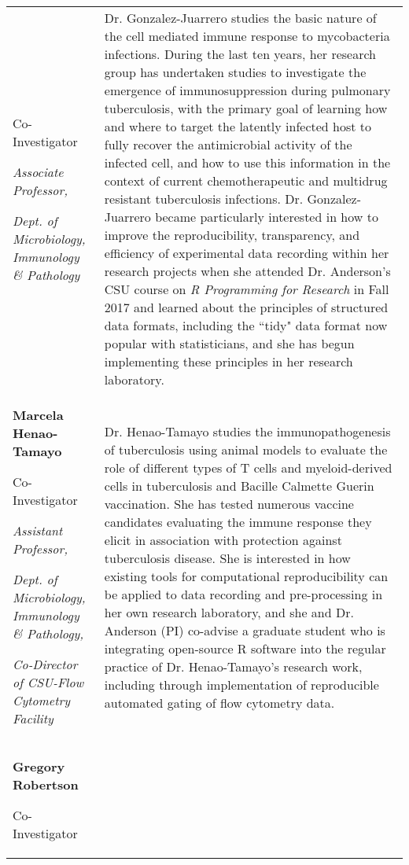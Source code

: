 \begin{table}[!h]
{\begin{tabular}[t]{>{\raggedright\arraybackslash}p{14em}>{\raggedright\arraybackslash}p{35em}}
  Co-Investigator
  
  \textit{Associate Professor,}
  
  \textit{Dept. of Microbiology, Immunology \& Pathology} & Dr. Gonzalez-Juarrero studies the basic nature of the
  cell mediated immune response to mycobacteria infections. During the last ten
  years, her research group has undertaken studies to investigate the emergence of
  immunosuppression during pulmonary tuberculosis, with the primary goal of
  learning how and where to target the latently infected host to fully recover the
  antimicrobial activity of the infected cell, and how to use this information in
  the context of current chemotherapeutic and multidrug resistant tuberculosis infections.
  Dr. Gonzalez-Juarrero became particularly interested in how to improve the
  reproducibility, transparency, and efficiency of experimental data recording
  within her research projects when she attended Dr. Anderson's CSU course on
  \textit{R Programming for Research} in Fall 2017 and learned about the
  principles of structured data formats, including the ``tidy" data format now
  popular with statisticians, and she has begun implementing these principles in her research laboratory.\\
\textbf{Marcela Henao-Tamayo}
  
  Co-Investigator
  
  \textit{Assistant Professor,}
  
  \textit{Dept. of Microbiology, Immunology \& Pathology,}
  
  \textit{Co-Director of CSU-Flow Cytometry Facility} & Dr. Henao-Tamayo studies the immunopathogenesis of
  tuberculosis using animal models to evaluate the role of different types of T
  cells and myeloid-derived cells in tuberculosis and Bacille
  Calmette Guerin vaccination. She has tested numerous
  vaccine candidates evaluating the immune response they elicit in association
  with protection against tuberculosis disease. She is interested in how existing
  tools for computational reproducibility can be applied to data recording and
  pre-processing in her own research laboratory, and she and Dr. Anderson (PI)
  co-advise a graduate student who is integrating open-source R software into the
  regular practice of Dr. Henao-Tamayo's research work, including through
  implementation of reproducible automated gating of flow cytometry data.\\
\textbf{Gregory Robertson}
  
  Co-Investigator
  

\end{tabular}}
\end{table}
